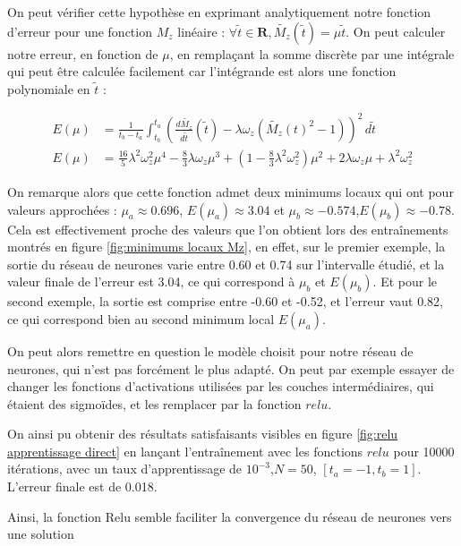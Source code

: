 \documentclass[12pt]{report}
\begin{document}
On peut vérifier cette hypothèse en exprimant analytiquement notre fonction d'erreur pour une fonction $M_z$ 
linéaire : $\forall \tilde{t} \in \mathbf{R}, \tilde{M_z}(\tilde{t}) = \mu  \tilde{t}$. On peut calculer notre erreur, 
en fonction de $\mu$, en remplaçant la somme discrète par une intégrale qui peut être calculée facilement car 
l'intégrande est alors une fonction polynomiale en $\tilde{t}$ :

\begin{equation}
    \begin{aligned}
        E(\mu) &= \frac{1}{t_b-t_a}\int_{t_b}^{t_a} (\frac{d\tilde{M_z}}{d\tilde{t}}(\tilde{t})-\lambda \omega_z (\tilde{M_z}(t)^2-1))^2 \,d \tilde{t} \\
        E(\mu) &= \frac{16}{5}\lambda^2\omega_z^2\mu^4 
            - \frac{8}{3}\lambda\omega_z\mu^3
            + (1- \frac{8}{3}\lambda^2\omega_z^2)\mu^2
            + 2\lambda\omega_z\mu
            + \lambda^2\omega_z^2
    \end{aligned}
    \label{eq:fonction d'erreur analytique, M_z linéaire}
\end{equation}

On remarque alors que cette fonction admet deux minimums locaux qui ont pour valeurs
approchées : $ \mu_a \approx 0.696$, $E(\mu_a) \approx 3.04$ et 
$\mu_b \approx -0.574$,$ E(\mu_b) \approx -0.78$. 
Cela est effectivement proche des valeurs que l'on obtient lors des 
entraînements montrés en figure \ref{fig:minimums locaux Mz}, en effet, sur le premier exemple,
la sortie du réseau de neurones varie entre 0.60 et 0.74 sur l'intervalle étudié, et
la valeur finale de l'erreur est 3.04, ce qui correspond à $\mu_b$ et $E(\mu_b)$.
Et pour le second exemple, la sortie est comprise entre -0.60 et -0.52, et l'erreur 
vaut 0.82, 
ce qui correspond bien au second minimum local $E(\mu_a)$.

On peut alors remettre en question le modèle choisit pour notre 
réseau de neurones, qui n'est pas forcément le plus adapté. On peut
par exemple essayer de changer les fonctions d'activations utilisées
par les couches intermédiaires, qui étaient des sigmoïdes, et les 
remplacer par la fonction $relu$.

On ainsi pu obtenir des résultats satisfaisants visibles en figure 
\ref{fig:relu apprentissage direct}
en lançant l'entraînement avec les fonctions $relu$ pour 10000 itérations, 
avec un taux d'apprentissage de $10^{-3}$,$N=50$, $[t_a = -1, t_b = 1]$.
L'erreur finale est de 0.018.

Ainsi, la fonction Relu semble faciliter la convergence du réseau de neurones
vers une solution 
\end{document}
